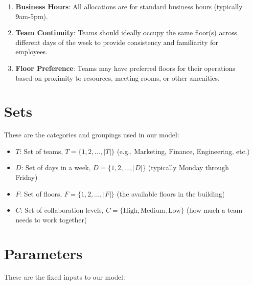 \documentclass[12pt,a4paper]{article}
\begin{document}
\begin{enumerate}
\item \textbf{Business Hours}: All allocations are for standard business hours (typically 9am-5pm).

\item \textbf{Team Continuity}: Teams should ideally occupy the same floor(s) across different days of the week to provide consistency and familiarity for employees.

\item \textbf{Floor Preference}: Teams may have preferred floors for their operations based on proximity to resources, meeting rooms, or other amenities.
\end{enumerate}

\section{Sets}

These are the categories and groupings used in our model:

\begin{itemize}
\item $T$: Set of teams, $T = \{1, 2, \ldots, |T|\}$ (e.g., Marketing, Finance, Engineering, etc.)
\item $D$: Set of days in a week, $D = \{1, 2, \ldots, |D|\}$ (typically Monday through Friday)
\item $F$: Set of floors, $F = \{1, 2, \ldots, |F|\}$ (the available floors in the building)
\item $C$: Set of collaboration levels, $C = \{\text{High}, \text{Medium}, \text{Low}\}$ (how much a team needs to work together)
\end{itemize}

\section{Parameters}

These are the fixed inputs to our model:
\end{document}
